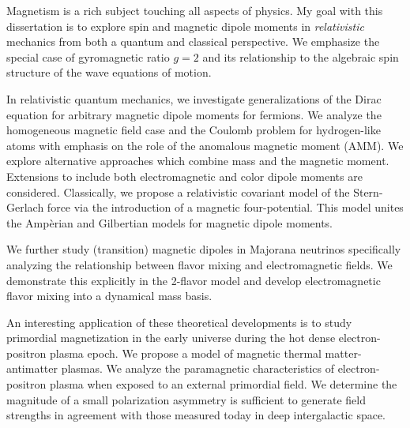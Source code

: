 

Magnetism is a rich subject touching all aspects of physics. My goal with this dissertation is to explore spin and magnetic dipole moments in \emph{relativistic} mechanics from both a quantum and classical perspective. We emphasize the special case of gyromagnetic ratio $g\!=\!2$ and its relationship to the algebraic spin structure of the wave equations of motion.

In relativistic quantum mechanics, we investigate generalizations of the Dirac equation for arbitrary magnetic dipole moments for fermions. We analyze the homogeneous magnetic field case and the Coulomb problem for hydrogen-like atoms with emphasis on the role of the anomalous magnetic moment (AMM). We explore alternative approaches which combine mass and the magnetic moment. Extensions to include both electromagnetic and color dipole moments are considered. Classically, we propose a relativistic covariant model of the Stern-Gerlach force via the introduction of a magnetic four-potential. This model unites the Amp{\`e}rian and Gilbertian models for magnetic dipole moments.

We further study (transition) magnetic dipoles in Majorana neutrinos specifically analyzing the relationship between flavor mixing and electromagnetic fields. We demonstrate this explicitly in the 2-flavor model and develop electromagnetic flavor mixing into a dynamical mass basis.

An interesting application of these theoretical developments is to study primordial magnetization in the early universe during the hot dense electron-positron plasma epoch. We propose a model of magnetic thermal matter-antimatter plasmas. We analyze the paramagnetic characteristics of electron-positron plasma when exposed to an external primordial field. We determine the magnitude of a small polarization asymmetry is sufficient to generate field strengths in agreement with those measured today in deep intergalactic space.